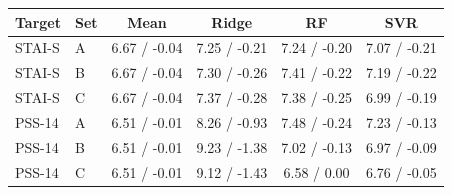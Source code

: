 \begin{tabular}{@{}llcccc@{}}
\toprule
Target & Set & Mean & Ridge & RF & SVR \\
\midrule
STAI-S & A & 6.67 / -0.04 & 7.25 / -0.21 & 7.24 / -0.20 & 7.07 / -0.21 \\
STAI-S & B & 6.67 / -0.04 & 7.30 / -0.26 & 7.41 / -0.22 & 7.19 / -0.22 \\
STAI-S & C & 6.67 / -0.04 & 7.37 / -0.28 & 7.38 / -0.25 & 6.99 / -0.19 \\
PSS-14 & A & 6.51 / -0.01 & 8.26 / -0.93 & 7.48 / -0.24 & 7.23 / -0.13 \\
PSS-14 & B & 6.51 / -0.01 & 9.23 / -1.38 & 7.02 / -0.13 & 6.97 / -0.09 \\
PSS-14 & C & 6.51 / -0.01 & 9.12 / -1.43 & 6.58 / 0.00 & 6.76 / -0.05 \\
\bottomrule
\end{tabular}
